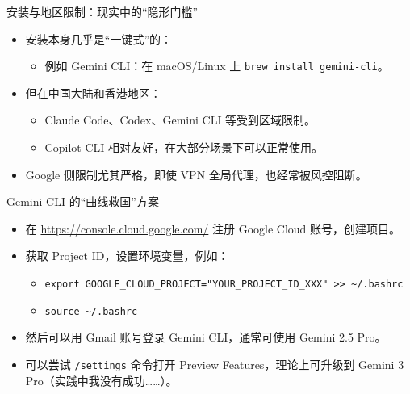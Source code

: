 \documentclass[aspectratio=169]{beamer}
\begin{document}
\begin{frame}{安装与地区限制：现实中的“隐形门槛”}
  \begin{itemize}
    \item 安装本身几乎是“一键式”的：
      \begin{itemize}
        \item 例如 Gemini CLI：在 macOS/Linux 上 \texttt{brew install gemini-cli}。
      \end{itemize}
    \item 但在中国大陆和香港地区：
      \begin{itemize}
        \item Claude Code、Codex、Gemini CLI 等受到区域限制。
        \item Copilot CLI 相对友好，在大部分场景下可以正常使用。
      \end{itemize}
    \item Google 侧限制尤其严格，即使 VPN 全局代理，也经常被风控阻断。
  \end{itemize}
\end{frame}

\begin{frame}{Gemini CLI 的“曲线救国”方案}
  \begin{itemize}
    \item 在 \url{https://console.cloud.google.com/} 注册 Google Cloud 账号，创建项目。
    \item 获取 Project ID，设置环境变量，例如：
      \begin{itemize}
        \item \verb|export GOOGLE_CLOUD_PROJECT="YOUR_PROJECT_ID_XXX" >> ~/.bashrc|
        \item \verb|source ~/.bashrc|
      \end{itemize}
    \item 然后可以用 Gmail 账号登录 Gemini CLI，通常可使用 Gemini 2.5 Pro。
    \item 可以尝试 \texttt{/settings} 命令打开 Preview Features，理论上可升级到 Gemini 3 Pro（实践中我没有成功……）。
  \end{itemize}
\end{frame}
\end{document}
